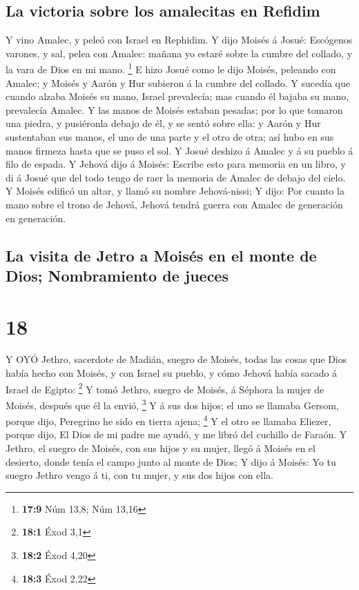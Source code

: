 \hypertarget{la-victoria-sobre-los-amalecitas-en-refidim}{%
\subsection{La victoria sobre los amalecitas en
Refidim}\label{la-victoria-sobre-los-amalecitas-en-refidim}}

 Y vino Amalec, y peleó con Israel en Rephidim. 
Y dijo Moisés á Josué: Escógenos varones, y sal, pelea con Amalec:
mañana yo estaré sobre la cumbre del collado, y la vara de Dios en mi
mano. \footnote{\textbf{17:9} Núm 13,8; Núm 13,16}  E hizo
Josué como le dijo Moisés, peleando con Amalec; y Moisés y Aarón y Hur
subieron á la cumbre del collado.  Y sucedía que cuando
alzaba Moisés su mano, Israel prevalecía; mas cuando él bajaba su mano,
prevalecía Amalec.  Y las manos de Moisés estaban pesadas;
por lo que tomaron una piedra, y pusiéronla debajo de él, y se sentó
sobre ella: y Aarón y Hur sustentaban sus manos, el uno de una parte y
el otro de otra; así hubo en sus manos firmeza hasta que se puso el sol.
 Y Josué deshizo á Amalec y á su pueblo á filo de espada.
 Y Jehová dijo á Moisés: Escribe esto para memoria en un
libro, y di á Josué que del todo tengo de raer la memoria de Amalec de
debajo del cielo.  Y Moisés edificó un altar, y llamó su
nombre Jehová-nissi;  Y dijo: Por cuanto la mano sobre el
trono de Jehová, Jehová tendrá guerra con Amalec de generación en
generación.

\hypertarget{la-visita-de-jetro-a-moisuxe9s-en-el-monte-de-dios-nombramiento-de-jueces}{%
\subsection{La visita de Jetro a Moisés en el monte de Dios;
Nombramiento de
jueces}\label{la-visita-de-jetro-a-moisuxe9s-en-el-monte-de-dios-nombramiento-de-jueces}}

\hypertarget{section-17}{%
\section{18}\label{section-17}}

 Y OYÓ Jethro, sacerdote de Madián, suegro de Moisés, todas
las cosas que Dios había hecho con Moisés, y con Israel su pueblo, y
cómo Jehová había sacado á Israel de Egipto: \footnote{\textbf{18:1}
  Éxod 3,1}  Y tomó Jethro, suegro de Moisés, á Séphora la
mujer de Moisés, después que él la envió, \footnote{\textbf{18:2} Éxod
  4,20}  Y á sus dos hijos; el uno se llamaba Gersom, porque
dijo, Peregrino he sido en tierra ajena; \footnote{\textbf{18:3} Éxod
  2,22}  Y el otro se llamaba Eliezer, porque dijo, El Dios
de mi padre me ayudó, y me libró del cuchillo de Faraón.  Y
Jethro, el suegro de Moisés, con sus hijos y su mujer, llegó á Moisés en
el desierto, donde tenía el campo junto al monte de Dios;  Y
dijo á Moisés: Yo tu suegro Jethro vengo á ti, con tu mujer, y sus dos
hijos con ella.

